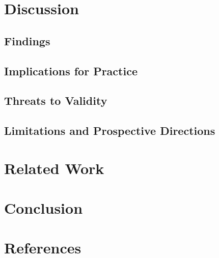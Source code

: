 \documentclass[review]{elsarticle}
\begin{document}
\section{Discussion}\label{sec:discussion}


\subsection{Findings}\label{sec:findings}


\subsection{Implications for Practice}\label{sec:implications}


\subsection{Threats to Validity}\label{sec:threats}


\subsection{Limitations and Prospective Directions}\label{sec:limitations}


\section{Related Work} \label{sec:related_works}


\section{Conclusion} \label{sec:conclusions}


\section*{References}


\end{document}
